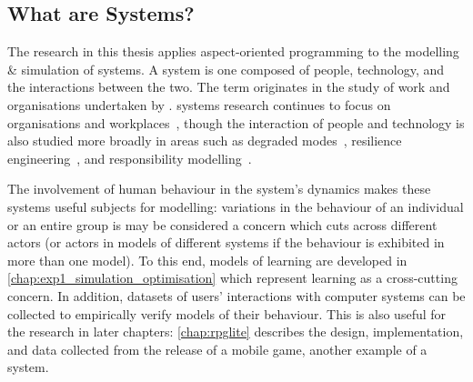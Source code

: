 




\subsection{What are \SocioTechnical Systems?}
\label{intro_what_are_sociotechnical_systems}

The research in this thesis applies aspect-oriented programming to the modelling
\& simulation of \sociotechnical systems. A \sociotechnical system is one
composed of people, technology, and the interactions between the two. The
term originates in the study of work and organisations undertaken by
\citet{trist1951sociotechnical}. \Sociotechnical systems research continues to
focus on organisations and
workplaces~\cite{pasmore2019reflections,baxter2011socio}, though the interaction
of people and technology is also studied more broadly in areas such as degraded
modes~\cite{johnson2007degradedmodes}, resilience
engineering~\cite{hollnagel2006resilience}, and responsibility
modelling~\cite{lock2009responsibility}.

The involvement of human behaviour in the system's dynamics makes these systems
useful subjects for \aspectoriented{} modelling: variations in the behaviour of
an individual or an entire group is may be considered a concern which cuts
across different actors (or actors in models of different systems if the
behaviour is exhibited in more than one model). To this end, models of learning
are developed in \cref{chap:exp1_simulation_optimisation} which represent
learning as a cross-cutting concern. In addition, datasets of users'
interactions with computer systems can be collected to empirically verify
\sociotechnical{} models of their behaviour. This is also useful for the
research in later chapters: \cref{chap:rpglite} describes the design,
implementation, and data collected from the release of a mobile game, another
example of a \sociotechnical system.

